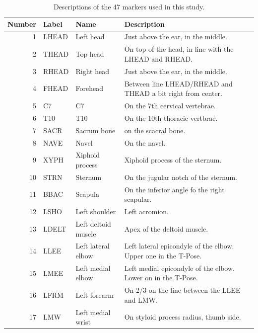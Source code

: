 \documentclass[10pt,a4paper,twocolumn]{article}
\begin{document}
\begin{table}
  \caption{Descriptions of the 47 markers used in this study.}
  \centering
  \small
  \begin{tabular}{rlll}
    \toprule
    Number & Label & Name & Description \\
    \midrule
    1  & LHEAD & Left head                             & Just above the ear, in the middle. \\
    2  & THEAD & Top head                              & On top of the head, in line with the LHEAD and RHEAD. \\
    3  & RHEAD & Right head                            & Just above the ear, in the middle. \\
    4  & FHEAD & Forehead                              & Between line LHEAD/RHEAD and THEAD a bit right from center. \\
    5  & C7    & C7                                    & On the 7th cervical vertebrae. \\
    6  & T10   & T10                                   & On the 10th thoracic vertbrae. \\
    7  & SACR  & Sacrum bone                           & on the scacral bone. \\
    8  & NAVE  & Navel                                 & On the navel. \\
    9  & XYPH  & Xiphoid process                       & Xiphoid process of the sternum. \\
    10 & STRN  & Sternum                               & On the jugular notch of the sternum. \\
    11 & BBAC  & Scapula                               & On the inferior angle fo the right scapular. \\
    12 & LSHO  & Left shoulder                         & Left acromion. \\
    13 & LDELT & Left deltoid muscle                   & Apex of the deltoid muscle. \\
    14 & LLEE  & Left lateral elbow                    & Left lateral epicondyle of the elbow. Upper one in the T-Pose. \\
    15 & LMEE  & Left medial elbow                     & Left medial epicondyle of the elbow. Lower on in the T-Pose. \\
    16 & LFRM  & Left forearm                          & On 2/3 on the line between the LLEE and LMW. \\
    17 & LMW   & Left medial wrist                     & On styloid process radius, thumb side. \\

\end{tabular}
\end{table}
\end{document}
